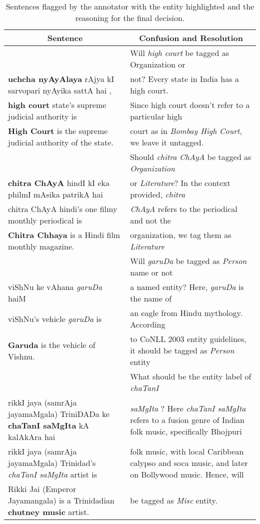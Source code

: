 \documentclass[10pt, a4paper]{article}
\DeclareRobustCommand{\indicWords}[1]{\raisebox{-\dp\strutbox}{\texttt{[image: indicWords]}}}
\begin{document}
\begin{table*}[!htb]
\centering
\begin{tabular}{@{}p{8.2cm}p{7cm}@{}}
\toprule
\multicolumn{1}{c}{\textbf{Sentence}} & \multicolumn{1}{c}{\textbf{Confusion and Resolution}} \\ \midrule
\indicWords{Asentence} & Will \textit{high court} be tagged as Organization or  \\
\textbf{uchcha nyAyAlaya} rAjya kI sarvopari nyAyika sattA hai , & not? Every state in India has a high court.  \\
\textbf{high court} state's supreme judicial authority is & Since high court doesn't refer to a particular high \\
\textbf{High Court} is the supreme judicial authority of the state. & court as in \textit{Bombay High Court}, we leave it untagged. \\
\midrule
\indicWords{Bsentence} & Should \textit{chitra ChAyA} be tagged as \textit{Organization} \\
\textbf{chitra ChAyA} hindI kI eka philmI mAsika patrikA hai &  or \textit{Literature}? In the context provided, \textit{chitra} \\
chitra ChAyA hindi's one filmy monthly periodical is &  \textit{ChAyA} refers to the periodical and not the \\
\textbf{Chitra Chhaya} is a Hindi film monthly magazine. & organization, we tag them as \textit{Literature} \\

\midrule
\indicWords{Csentence} & Will \textit{garuDa} be tagged as \textit{Person} name or not   \\
viShNu ke vAhana \textit{garuDa} haiM & a named entity? Here, \textit{garuDa} is the name of \\
viShNu's vehicle \textit{garuDa} is & an eagle from Hindu mythology. According \\
\textbf{Garuda} is the vehicle of Vishnu. & to CoNLL 2003 entity guidelines, it should be tagged as \textit{Person} entity \\
\midrule
\indicWords{Dsentence} & What should be the entity label of \textit{chaTanI} \\ 
rikkI jaya (samrAja jayamaMgala) TriniDADa ke \textbf{chaTanI saMgIta} kA kalAkAra hai  & \textit{saMgIta} ? Here \textit{chaTanI saMgIta} refers to a fusion genre of Indian folk music, specifically Bhojpuri  \\
rikkI jaya (samrAja jayamaMgala) Trinidad's \textit{chaTanI saMgIta} artist is &  folk music, with local Caribbean calypso and soca music, and later on Bollywood music. Hence, will \\
Rikki Jai (Emperor Jayamangala) is a Trinidadian \textbf{chutney music} artist. & be tagged as \textit{Misc} entity.\\
\bottomrule
\end{tabular}
\caption{Sentences flagged by the annotator with the entity highlighted and the reasoning for the final decision.}
\label{tab:ambiguousSentence}
\end{table*}
\end{document}
